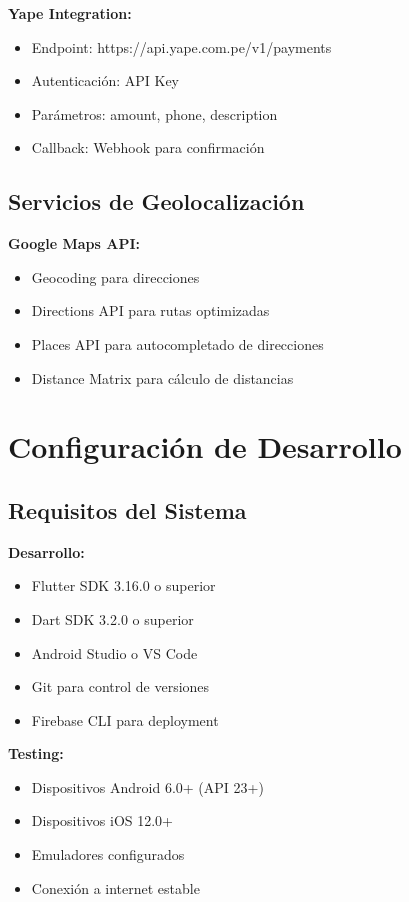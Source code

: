 \documentclass[12pt,a4paper]{report}
\begin{document}
\textbf{Yape Integration:}
\begin{itemize}
	\item Endpoint: https://api.yape.com.pe/v1/payments
	\item Autenticación: API Key
	\item Parámetros: amount, phone, description
	\item Callback: Webhook para confirmación
\end{itemize}

\subsection{Servicios de Geolocalización}

\textbf{Google Maps API:}
\begin{itemize}
	\item Geocoding para direcciones
	\item Directions API para rutas optimizadas
	\item Places API para autocompletado de direcciones
	\item Distance Matrix para cálculo de distancias
\end{itemize}

\section{Configuración de Desarrollo}

\subsection{Requisitos del Sistema}

\textbf{Desarrollo:}
\begin{itemize}
	\item Flutter SDK 3.16.0 o superior
	\item Dart SDK 3.2.0 o superior
	\item Android Studio o VS Code
	\item Git para control de versiones
	\item Firebase CLI para deployment
\end{itemize}

\textbf{Testing:}
\begin{itemize}
	\item Dispositivos Android 6.0+ (API 23+)
	\item Dispositivos iOS 12.0+
	\item Emuladores configurados
	\item Conexión a internet estable
\end{itemize}
\end{document}
